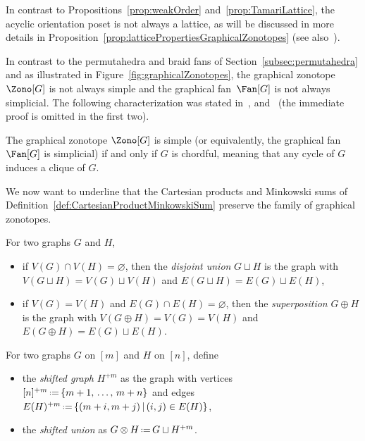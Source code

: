 \documentclass[AHL,Unicode,longabstracts,published]{cedram}
\newcommand{\eqdef}{\mbox{\,\raisebox{0.2ex}{\scriptsize\ensuremath{\mathrm:}}\ensuremath{=}\,}}
\begin{document}
\begin{rema}\label{rem:acyclicOrientationPosetNotLattice}
In contrast to Propositions~\ref{prop:weakOrder} and~\ref{prop:TamariLattice}, the acyclic orientation poset is not always a lattice, as will be discussed in more details in Proposition~\ref{prop:latticePropertiesGraphicalZonotopes} (see also~\cite{Pilaud-acyclicReorientationLattices}).
\end{rema}

In contrast to the permutahedra and braid fans of Section~\ref{subsec:permutahedra} and as illustrated in Figure~\ref{fig:graphicalZonotopes}, the graphical zonotope $\Zono[G]$ is not always simple and the graphical fan~$\Fan[G]$ is not always simplicial. The following characterization was stated in~\cite[Rem.~6.2]{Kim}, \cite[Prop.~5.2]{PostnikovReinerWilliams} and~\cite[Prop.~52]{Pilaud-acyclicReorientationLattices} (the immediate proof is omitted in the first two).

\begin{prop}\label{prop:simpleGraphicalZonotope}
The graphical zonotope $\Zono[G]$ is simple (or equivalently, the graphical fan $\Fan[G]$ is simplicial) if and only if $G$ is chordful, meaning that any cycle of $G$ induces a clique of $G$.
\end{prop}

We now want to underline that the Cartesian products and Minkowski sums of Definition~\ref{def:CartesianProductMinkowskiSum} preserve the family of graphical zonotopes.

\begin{defi}\label{def:disjointUnionEdgeUnionGraphs}
For two graphs $G$ and $H$,
\begin{itemize}
\item if $V(G) \cap V(H) = \varnothing$, then the
\emph{disjoint union} $G \sqcup H$ is the graph with \linebreak $V(G \sqcup H) = V(G) \sqcup V(H)$ and $E(G \sqcup H) = E(G) \sqcup E(H)$,
\item if $V(G) = V(H)$ and $E(G) \cap E(H) = \varnothing$, then the
\emph{superposition} $G \oplus H$ is the graph with ${V(G \oplus H) = V(G) = V(H)}$ and $E(G \oplus H) = E(G) \sqcup E(H)$.
\end{itemize}
\end{defi}

\begin{defi}\label{def:shiftedIntegerGraphs}
For two graphs $G$ on $[m]$ and $H$ on $[n]$, define
\begin{itemize}
\item the
\emph{shifted graph} $H^{+m}$ as the graph with vertices $[n]^{+m} \eqdef \{m+1,\,\dots,\,m+n\}$ and edges $E(H)^{+m} \eqdef \{(m+i, m+j)\,|\,(i,j) \in E(H)\}$,
\item the
\emph{shifted union} as $G \otimes H \eqdef G \sqcup H^{+m}$.
\end{itemize}
\end{defi}
\end{document}
